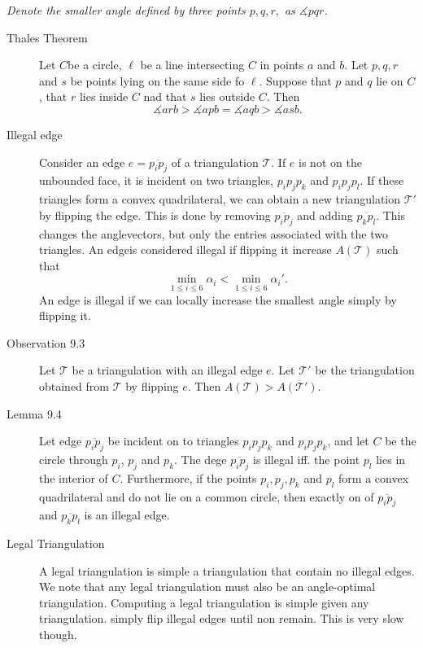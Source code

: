 \textit{Denote the smaller angle defined by three points $p,q,r,$ as
  $\measuredangle pqr$.}

\begin{description}
\item[Thales Theorem] Let $C$be a circle, $\ell$ be a line intersecting $C$ in
  points $a$ and $b$. Let $p, q, r$ and $s$ be points lying on the same side fo
  $\ell$. Suppose that $p$ and $q$ lie on $C$, that $r$ lies inside $C$ nad that
  $s$ lies outside $C$.  Then
  \[
    \measuredangle arb > \measuredangle apb = \measuredangle aqb > \measuredangle asb.
  \]

\item[Illegal edge] Consider an edge $e = \overline{p_ip_j}$ of a triangulation
  $\mathcal{T}$. If $e$ is not on the unbounded face, it is incident on two
  triangles, $p_ip_jp_k$ and $p_ip_jp_l$. If these triangles form a convex
  quadrilateral, we can obtain a new triangulation $\mathcal{T}'$ by flipping
  the edge. This is done by removing $\overline{p_ip_j}$ and adding
  $\overline{p_kp_l}$. This changes the anglevectors, but only the entries
  associated with the two triangles.  An edgeis considered illegal if flipping
  it increase $A(\mathcal{T})$ such that
  \[
    \underset{1\leq i \leq 6}{\min} \alpha_i < \underset{1\leq i\leq 6}{\min} \alpha_i'.
  \]
  An edge is illegal if we can locally increase the smallest angle simply by flipping it.

\item[Observation 9.3] Let $\mathcal{T}$ be a triangulation with an illegal edge
  $e$. Let $\mathcal{T}'$ be the triangulation obtained from $\mathcal{T}$ by
  flipping $e$. Then $A(\mathcal{T}) > A(\mathcal{T}')$.

\item[Lemma 9.4] Let edge $\overline{p_ip_j}$ be incident on to triangles
  $p_ip_jp_k$ and $p_ip_jp_k$, and let $C$ be the circle through $p_i$, $p_j$
  and $p_k$. The dege $\overline{p_ip_j}$ is illegal iff. the point $p_l$ lies
  in the interior of $C$.  Furthermore, if the points $p_i, p_j, p_k$ and $p_l$
  form a convex quadrilateral and do not lie on a common circle, then exactly on
  of $\overline{p_ip_j}$ and $\overline{p_kp_l}$ is an illegal edge.

\item[Legal Triangulation] A legal triangulation is simple a triangulation that
  contain no illegal edges. We note that any legal triangulation must also be an
  angle-optimal triangulation. Computing a legal triangulation is simple given
  any triangulation.  simply flip illegal edges until non remain. This is very
  slow though.
\end{description}








